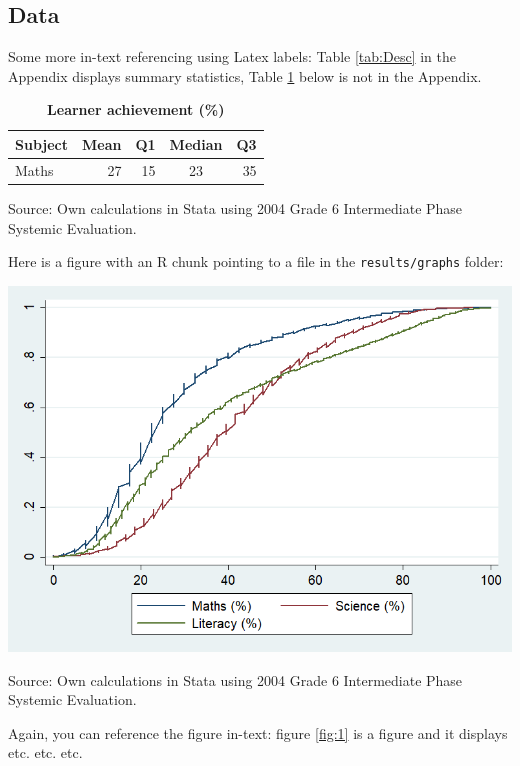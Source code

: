 \documentclass[12pt,preprint, authoryear]{article}
\let\origfigure\figure
\let\endorigfigure\endfigure
\renewenvironment{figure}[1][2] {
    \expandafter\origfigure\expandafter[H]
} {
    \endorigfigure
}
\numberwithin{equation}{section}
\numberwithin{figure}{section}
\numberwithin{table}{section}
\begin{document}
\subsection{\texorpdfstring{Data \label{Desc}}{Data }}\label{data}

Some more in-text referencing using Latex labels: Table \ref{tab:Desc}
in the Appendix displays summary statistics, Table \ref{tab:Dep} below
is not in the Appendix.

\footnotesize
\renewcommand{\thetable}{\arabic{table}}

\begin{longtable} {@{} l r r c r @{}} \caption{\textbf{Learner achievement (\%)}}
\label{tab:Dep}\\ \hline \hline
Subject & Mean & Q1 & Median & Q3 \\
\hline
Maths&      27& 15&   23&  35\\ \hline \hline
\end{longtable}\begin{center} Source: Own calculations in Stata using 2004 Grade 6 Intermediate Phase Systemic Evaluation.\end{center}

\normalsize

Here is a figure with an R chunk pointing to a file in the
\texttt{results/graphs} folder:

\setcounter{figure}{0} \renewcommand{\thefigure}{\arabic{figure}}

\begin{figure}
\caption{\textbf{\footnotesize Cumulative graph for subject scores}}
\label{fig:1}

\begin{center}\includegraphics[width=0.4\linewidth]{./results/graphs/figure} \end{center}
\centering
{\footnotesize Source: Own calculations in Stata using 2004 Grade 6 Intermediate Phase Systemic Evaluation.}
\end{figure}

\normalsize

Again, you can reference the figure in-text: figure \ref{fig:1} is a
figure and it displays etc. etc. etc.
\end{document}
